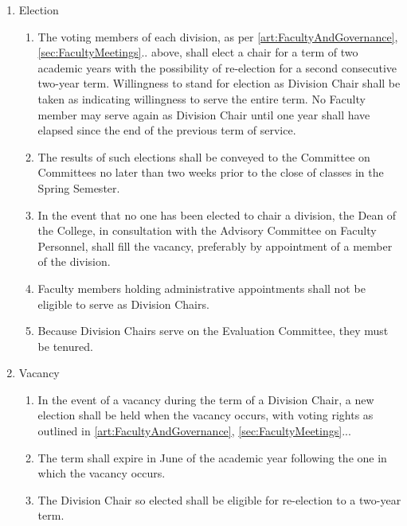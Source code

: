 \documentclass{manual}
\newcommand{\itemLevelA}{\alph*.}
\newcommand{\itemLevelB}{\arabic*)}
\newcommand{\itemRefA}{\alph*}
\newcommand{\itemRefB}{\arabic*}
\begin{document}
	\begin{enumerate}[label=\itemLevelA,ref=\itemRefA]
	\item Election

		\begin{enumerate}[label=\itemLevelB,ref=\itemRefB]
		\item The voting members of each division, as per \cref{art:FacultyAndGovernance}, \cref{sec:FacultyMeetings}.. above, shall elect a chair for a term of two academic years with the possibility of re-election for a second consecutive two-year term. Willingness to stand for election as Division Chair shall be taken as indicating willingness to serve the entire term. No Faculty member may serve again as Division Chair until one year shall have elapsed since the end of the previous term of service.
		\item The results of such elections shall be conveyed to the Committee on Committees no later than two weeks prior to the close of classes in the Spring Semester.
		\item In the event that no one has been elected to chair a division, the Dean of the College, in consultation with the Advisory Committee on Faculty Personnel, shall fill the vacancy, preferably by appointment of a member of the division.
		\item Faculty members holding administrative appointments shall not be eligible to serve as Division Chairs.
		\item  Because Division Chairs serve on the Evaluation Committee, they must be tenured.
		\end{enumerate}
	
	\item Vacancy

		\begin{enumerate}[label=\itemLevelB,ref=\itemRefB]
		\item In the event of a vacancy during the term of a Division Chair, a new election shall be held when the vacancy occurs, with voting rights as outlined in \cref{art:FacultyAndGovernance}, \cref{sec:FacultyMeetings}...
		\item The term shall expire in June of the academic year following the one in which the vacancy occurs.
		\item The Division Chair so elected shall be eligible for re-election to a two-year term. 
		\end{enumerate}
	

\end{enumerate}
\end{document}

